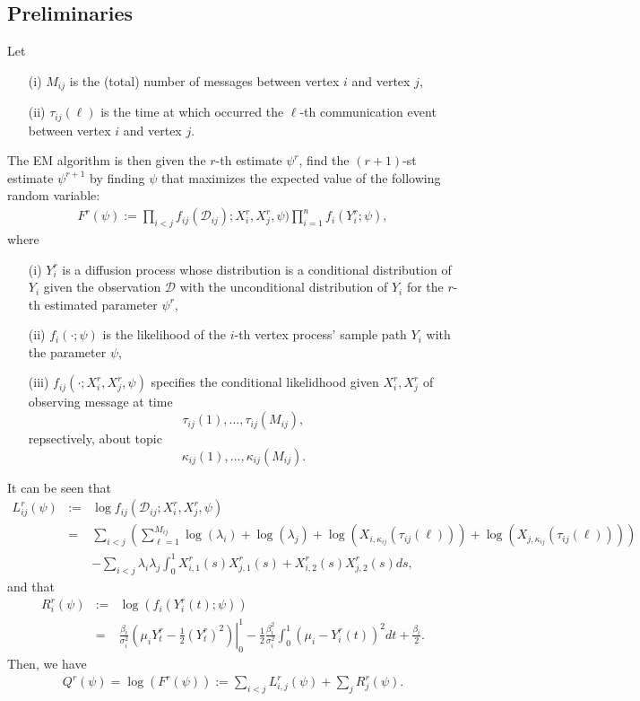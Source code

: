 \documentclass[12pt]{article}%
\begin{document}
\subsection{Preliminaries}
Let
\begin{enumerate}
\item[(i)] $M_{ij}$ is the (total) number of messages between vertex $i$ and vertex $j$,
\item[(ii)] $\tau_{ij}(\ell)$ is the time at which occurred the $\ell$-th communication event  between vertex $i$ and vertex $j$.
\end{enumerate}
The EM algorithm is then given the $r$-th estimate $\psi^r$, find the $(r+1)$-st estimate $\psi^{r+1}$ by 
finding $\psi$ that maximizes the expected value of the following random variable:
\begin{eqnarray}
F^r(\psi):=\prod_{i<j} f_{ij}(\mathcal D_{ij});X_i^r,X_j^r,\psi) \prod_{i=1}^n f_{i}(Y_i^r;\psi),
\end{eqnarray}
where 
\begin{enumerate}
\item[(i)] $Y_i^r$ is a diffusion process whose distribution is a conditional distribution of $Y_i$ given the observation $\mathcal D$ with the unconditional distribution of $Y_i$ for the $r$-th estimated parameter $\psi^r$,
\item[(ii)] $f_{i}(\cdot;\psi)$ is the likelihood of the $i$-th vertex 
process' sample path $Y_i$ with the parameter $\psi$,
\item[(iii)] $f_{ij}(\cdot;X_i^r,X_j^r,\psi)$ specifies the conditional likelidhood given $X_i^r,X_j^r$ of 
observing message at time 
$$
\tau_{ij}(1),\ldots, \tau_{ij}(M_{ij}),
$$
repsectively, about topic 
$$
\kappa_{ij}(1),\ldots, \kappa_{ij}(M_{ij}).
$$
\end{enumerate}
It can be seen that
\begin{eqnarray*}
L_{ij}^r(\psi) 
&:= & \log f_{ij}(\mathcal D_{ij} ;X_i^r,X_j^r,\psi) \\
&= &  \sum_{i<j} 
\left(
\sum_{\ell=1}^{M_{ij}} \log(\lambda_i) + \log(\lambda_j) + 
\log(X_{i,\kappa_{ij}}(\tau_{ij}(\ell))) +
\log(X_{j,\kappa_{ij}}(\tau_{ij}(\ell))) \right) \\
&\ &  - \sum_{i<j} \lambda_i\lambda_j \int_0^1 X_{i,1}^r(s)X_{j,1}^r(s)+X_{i,2}^r(s)X_{j,2}^r(s) ds,
\end{eqnarray*}
and that 
\begin{eqnarray*}
R_i^r(\psi) 
&:= & \log (f_i(Y_{i}^r(t);\psi))\\
&= &
\left. \frac{\beta_i}{\sigma_i^2} \left( \mu_i Y_t^r - \frac{1}{2} (Y_t^r)^2\right) \right|_0^1
- \frac{1}{2} \frac{\beta_i^2}{\sigma_i^2} \int_0^1 (\mu_i-Y_{i}^r(t))^2 dt + \frac{\beta_i}{2}. 
\end{eqnarray*}
Then, we have 
\begin{eqnarray}
Q^r(\psi) = \log(F^r(\psi)) := \sum_{i<j} L_{i,j}^r(\psi) + \sum_{j} R_j^r(\psi).  
\end{eqnarray}
\end{document}
